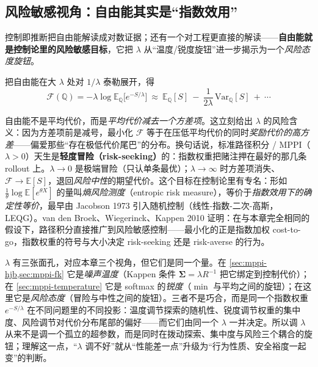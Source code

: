 \subsection{风险敏感视角：自由能其实是“指数效用”}
\label{sec:mppi-risk}

控制即推断把自由能解读成对数证据；还有一个对工程更直接的解读——\textbf{自由能就是控制论里的风险敏感目标}，它把 $\lambda$ 从“温度/锐度旋钮”进一步揭示为一个\emph{风险态度旋钮}。

\begin{theorem}\label{thm:mppi-meanvar}
把自由能在大 $\lambda$ 处对 $1/\lambda$ 泰勒展开，得
\begin{equation}
  \mathcal{F}(\mathbb{Q})=-\lambda\log\mathbb{E}_{\mathbb{Q}}\big[e^{-S/\lambda}\big]\ \approx\ \mathbb{E}_{\mathbb{Q}}[S]\ -\ \frac{1}{2\lambda}\,\mathrm{Var}_{\mathbb{Q}}[S]\ +\ \cdots
  \label{eq:mppi-meanvar}
\end{equation}
\end{theorem}

\noindent 自由能不是平均代价，而是\emph{平均代价减去一个方差项}。这立刻给出 $\lambda$ 的风险含义：因为方差项前是减号，最小化 $\mathcal{F}$ 等于在压低平均代价的同时\emph{奖励代价的高方差}——偏爱那些“存在极低代价尾巴”的分布。换句话说，标准路径积分 / MPPI（$\lambda>0$）天生是\textbf{轻度冒险（risk-seeking）}的：指数权重把赌注押在最好的那几条 rollout 上。$\lambda\to0$ 是极端冒险（只认单条最优）；$\lambda\to\infty$ 时方差项消失、$\mathcal{F}\to\mathbb{E}[S]$，退回\emph{风险中性}的期望代价。这个目标在控制论里有专名：形如 $\tfrac{1}{\theta}\log\mathbb{E}[e^{\theta X}]$ 的量叫\emph{熵风险测度}（entropic risk measure），等价于\emph{指数效用下的确定性等价}，最早由 Jacobson 1973 引入随机控制（线性-指数-二次-高斯，LEQG）\cite{jacobson1973optimal}。van den Broek、Wiegerinck、Kappen 2010 证明：在与本章完全相同的假设下，路径积分直接推广到风险敏感控制——最小化的正是指数加权 cost-to-go，指数权重的符号与大小决定 risk-seeking 还是 risk-averse 的行为\cite{vandenbroek2010risk}。

\begin{insight}
$\lambda$ 有三张面孔，对应本章三个视角，但它们是同一个量。在 \cref{sec:mppi-hjb,sec:mppi-fk} 它是\emph{噪声温度}（Kappen 条件 $\boldsymbol{\Sigma}=\lambda R^{-1}$ 把它绑定到控制代价）；在 \cref{sec:mppi-temperature} 它是 softmax 的\emph{锐度}（$\min$ 与平均之间的旋钮）；在这里它是\emph{风险态度}（冒险与中性之间的旋钮）。三者不是巧合，而是同一个指数权重 $e^{-S/\lambda}$ 在不同问题里的不同投影：温度调节探索的随机性、锐度调节权重的集中度、风险调节对代价分布尾部的偏好——而它们由同一个 $\lambda$ 一并决定。所以调 $\lambda$ 从来不是调一个孤立的超参数，而是同时在拨动探索、集中度与风险三个耦合的旋钮；理解这一点，“$\lambda$ 调不好”就从“性能差一点”升级为“行为性质、安全裕度一起变”的判断。
\end{insight}

